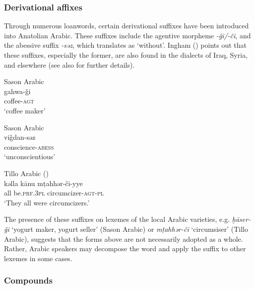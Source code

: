\documentclass[output=paper]{langsci/langscibook}
\begin{document}

\subsubsection{Derivational affixes}

Through numerous loanwords, certain derivational suffixes have been introduced into Anatolian Arabic. These suffixes include the agentive morpheme \textit{-\v{g}i/-\v{c}i}, and the abessive suffix \textit{-səz}, which translates as `without'. Ingham (\citeyear[178]{Ingham2011afg}) points out that these suffixes, especially the former, are also found in the dialects of Iraq, Syria, and elsewhere (see also \citealt{Procházka-Eisl2018} for further details).

\begin{exe}
\ex 
\begin{xlist}
\ex Sason Arabic 
\\ \gll gahwa-\v{g}i \\
coffee-\textsc{agt}\\
\glt `coffee maker'

\ex Sason Arabic \\
\gll vi\v{g}dan-səz \\
conscience-\textsc{abess}\\
\glt `unconscientious'

\ex Tillo Arabic (\citealt[199]{Lahdo2009})\\
\gll kəlla k\={a}nu m\d{t}ahhər-\v{c}i-yye \\
all be.\textsc{prf.3pl} circumcizer-\textsc{agt-pl}\\
\glt  `They all were circumcizers.'
\end{xlist}
\end{exe}



\noindent The presence of these suffixes on lexemes of the local Arabic varieties, e.g. \textit{ḫ\={a}ser-\v{g}i} `yogurt maker, yogurt seller' (Sason Arabic) or \textit{m\d{t}ahhər-\v{c}i} `circumsiser' (Tillo Arabic), suggests that the forms above are not necessarily adopted as a whole. Rather, Arabic speakers may decompose the word and apply the suffix to other lexemes in some cases.

\subsubsection{Compounds}
\end{document}

